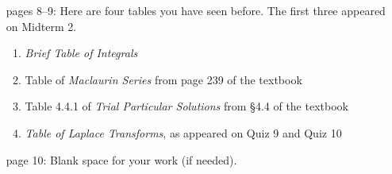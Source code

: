 \documentclass[12pt]{article}
\begin{document}
\begin{itemize}
\item[pages 8--9:]  Here are four tables you have seen before.  The first three appeared on Midterm 2.
    \begin{enumerate}
    \item \emph{Brief Table of Integrals}
    \item Table of \emph{Maclaurin Series} from page 239 of the textbook
    \item Table 4.4.1 of \emph{Trial Particular Solutions} from \S4.4 of the textbook
    \item \emph{Table of Laplace Transforms}, as appeared on Quiz 9 and Quiz 10
    \end{enumerate}
\item[page 10:]  Blank space for your work (if needed).
\end{itemize}
\end{document}
